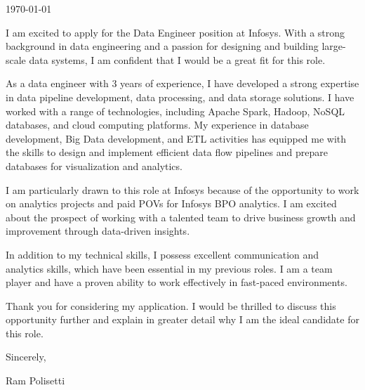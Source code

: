 \documentclass{ExpressiveCoverLetter}
\begin{document}
\coverletterheader[
    middleinitial=Ram Polisetti,
    email=rampolisettius@gmail.com,
    phone=716-256-7258,
    linkedin=ram-polisetti,
    state=WA
]

\vspace{0.25in}
\today
\vspace{0.15in}


I am excited to apply for the Data Engineer position at Infosys. With a
strong background in data engineering and a passion for designing and
building large-scale data systems, I am confident that I would be a
great fit for this role.

As a data engineer with 3 years of experience, I have developed a strong
expertise in data pipeline development, data processing, and data
storage solutions. I have worked with a range of technologies, including
Apache Spark, Hadoop, NoSQL databases, and cloud computing platforms. My
experience in database development, Big Data development, and ETL
activities has equipped me with the skills to design and implement
efficient data flow pipelines and prepare databases for visualization
and analytics.

I am particularly drawn to this role at Infosys because of the
opportunity to work on analytics projects and paid POVs for Infosys BPO
analytics. I am excited about the prospect of working with a talented
team to drive business growth and improvement through data-driven
insights.

In addition to my technical skills, I possess excellent communication
and analytics skills, which have been essential in my previous roles. I
am a team player and have a proven ability to work effectively in
fast-paced environments.

Thank you for considering my application. I would be thrilled to discuss
this opportunity further and explain in greater detail why I am the
ideal candidate for this role.

Sincerely,

\vspace{.15in}

Ram Polisetti
\end{document}
